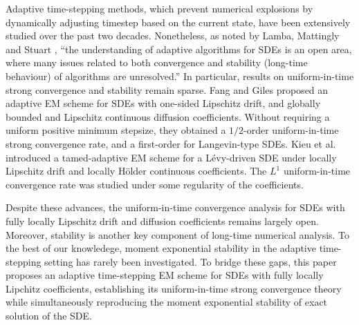 \documentclass[preprint,12pt,compress]{elsarticle}
\begin{document}
Adaptive time-stepping methods, which prevent numerical explosions by dynamically adjusting timestep based on the current state, have been extensively studied over the past two decades. 
Nonetheless, as noted by Lamba, Mattingly and Stuart \cite[p. 479]{lamba2007an}, ``the understanding of adaptive algorithms for SDEs is an open area, where many issues related to both convergence and stability (long-time behaviour) of algorithms are unresolved.''
In particular, results on uniform-in-time strong convergence and stability remain sparse.
Fang and Giles \cite{fang2020adaptive} proposed an adaptive EM scheme for SDEs with one-sided Lipschitz drift, and globally bounded and Lipschitz continuous diffusion coefficients. 
Without requiring a uniform positive minimum stepsize, they obtained a $1/2$-order uniform-in-time strong convergence rate, and a first-order for Langevin-type SDEs.  
Kieu et al. \cite{kieu2022strong} introduced a tamed-adaptive EM scheme for a L\'evy-driven SDE under locally Lipschitz drift and locally H\"older continuous coefficients. The $L^1$ uniform-in-time convergence rate was studied under some regularity of the coefficients.

Despite these advances, the uniform-in-time convergence analysis for SDEs with fully locally Lipschitz drift and diffusion coefficients remains largely open. 
Moreover, stability is another key component of long-time numerical analysis. To the best of our knowledege, moment exponential stability in the adaptive time-stepping setting has rarely been investigated.
To bridge these gaps, this paper proposes an adaptive time-stepping EM scheme for SDEs with fully locally Lipchitz coefficients, establishing its uniform-in-time strong convergence theory while simultaneously reproducing the moment exponential stability of exact solution of the SDE. 
\end{document}
